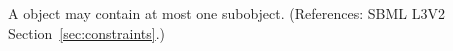 A \Constraint object may contain at most one \Message subobject.
(References: SBML L3V2 Section~\ref{sec:constraints}.)
